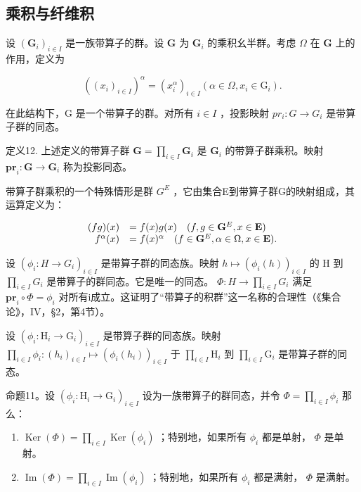 \subsection{乘积与纤维积}

设 \((\mathbf{G}_i)_{i\in I}\) 是一族带算子的群。设 \(\mathbf{G}\) 为 \(\mathbf{G}_i\) 的乘积幺半群。考虑 \(\Omega\) 在 \(\mathbf{G}\) 上的作用，定义为

\[
((x _ {i}) _ {i \in I}) ^ {\alpha} = (x _ {i} ^ {\alpha}) _ {i \in I} (\alpha \in \Omega , x _ {i} \in \mathrm{G} _ {i}).
\]

在此结构下，G 是一个带算子的群。对所有 \(i \in I\) ，投影映射 \(pr_{i}: G \to G_{i}\) 是带算子群的同态。

定义12. 上述定义的带算子群 \(\mathbf{G} = \prod_{i\in I}\mathbf{G}_i\) 是 \(\mathbf{G}_i\) 的带算子群乘积。映射 \(\mathbf{pr}_i\colon \mathbf{G}\to \mathbf{G}_i\) 称为投影同态。

带算子群乘积的一个特殊情形是群 \(G^{E}\) ，它由集合E到带算子群G的映射组成，其运算定义为：

\[
\begin{array}{r l} (f g) (x) & = f (x) g (x) \quad (f, g \in \mathbf {G} ^ {E}, x \in \mathbf {E}) \\ f ^ {\alpha} (x) & = f (x) ^ {\alpha} \quad (f \in \mathbf {G} ^ {E}, \alpha \in \Omega , x \in \mathbf {E}). \end{array}
\]

设 \((\phi_{i} \colon H \to G_{i})_{i \in I}\) 是带算子群的同态族。映射 \(h \mapsto (\phi_{i}(h))_{i \in I}\) 的 H 到 \(\prod_{i \in I} G_{i}\) 是带算子的群同态。它是唯一的同态。 \(\Phi \colon H \to \prod_{i \in I} G_{i}\) 满足 \(\mathbf{pr}_{i} \circ \Phi = \phi_{i}\) 对所有i成立。这证明了“带算子的积群”这一名称的合理性（《集合论》，IV，§2，第4节）。

设 \((\phi_i: \mathrm{H}_i \to \mathrm{G}_i)_{i \in I}\) 是带算子群的同态族。映射 \(\prod_{i \in I} \phi_i: (h_i)_{i \in I} \mapsto (\phi_i(h_i))_{i \in I}\) 于 \(\prod_{i \in I} \mathrm{H}_i\) 到 \(\prod_{i \in I} \mathrm{G}_i\) 是带算子群的同态。

命题11。设 \((\phi_i: \mathrm{H}_i \to \mathrm{G}_i)_{i \in I}\) 设为一族带算子的群同态，并令 \(\Phi = \prod_{i \in I} \phi_i\) 那么：

\begin{enumerate}
\def\labelenumi{(\alph{enumi})}
\item
  \(\operatorname{Ker}(\Phi) = \prod_{i \in I} \operatorname{Ker}(\phi_i)\) ；特别地，如果所有 \(\phi_i\) 都是单射， \(\Phi\) 是单射。
\item
  \(\operatorname{Im}(\Phi) = \prod_{i\in I}\operatorname{Im}(\phi_i)\) ；特别地，如果所有 \(\phi_i\) 都是满射， \(\Phi\) 是满射。
\end{enumerate}

